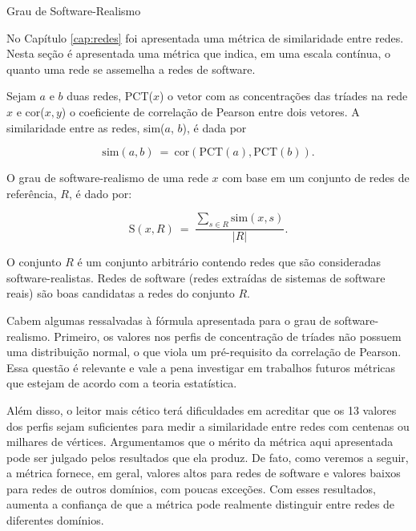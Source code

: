 \begin{section}{Grau de Software-Realismo}
	
	No Capítulo \ref{cap:redes} foi apresentada uma métrica de similaridade entre redes. Nesta seção é apresentada uma métrica que indica, em uma escala contínua, o quanto uma rede se assemelha a redes de software.
	
	Sejam $a$ e $b$ duas redes, PCT($x$) o vetor com as concentrações das tríades na rede $x$ e cor($x, y$) o coeficiente de correlação de Pearson entre dois vetores. A similaridade entre as redes, sim($a$, $b$), é dada por

	$$
	\mathrm{sim}(a, b) ~=~ 
	  \mathrm{cor}(\mathrm{PCT}(a), \mathrm{PCT}(b))\mathrm{.}
	$$
	
	O grau de software-realismo de uma rede $x$ com base em um conjunto de redes de referência, $R$, é dado por:
	
	$$
	\mathrm{S}(x, R) ~=~ \frac{
	\displaystyle\sum_{s \in R} \mathrm{sim}(x, s)
	}{|R|} \mbox{.}
	$$

	O conjunto $R$ é um conjunto arbitrário contendo redes que são consideradas software-realistas. Redes de software (redes extraídas de sistemas de software reais) são boas candidatas a redes do conjunto $R$.
	
	Cabem algumas ressalvadas à fórmula apresentada para o grau de software-realismo. Primeiro, os valores nos perfis de concentração de tríades não possuem uma distribuição normal, o que viola um pré-requisito da correlação de Pearson. Essa questão é relevante e vale a pena investigar em trabalhos futuros métricas que estejam de acordo com a teoria estatística.
	
	Além disso, o leitor mais cético terá dificuldades em acreditar que os 13 valores dos perfis sejam suficientes para medir a similaridade entre redes com centenas ou milhares de vértices. Argumentamos que o mérito da métrica aqui apresentada pode ser julgado pelos resultados que ela produz. De fato, como veremos a seguir, a métrica fornece, em geral, valores altos para redes de software e valores baixos para redes de outros domínios, com poucas exceções. Com esses resultados, aumenta a confiança de que a métrica pode realmente distinguir entre redes de diferentes domínios.
	
\end{section}
	
